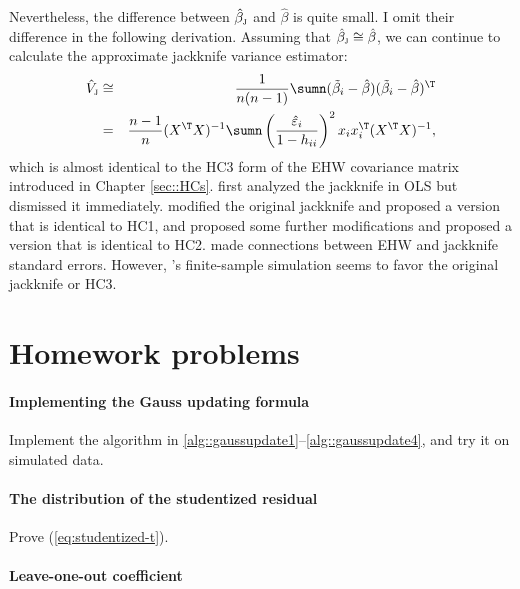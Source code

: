  
 Nevertheless, the difference between $\hat{\beta}_\textsc{j}$ and $\hat{\beta}$  is quite small. I omit their difference in the following derivation. Assuming that $\hat{\beta}_\textsc{j}  \cong \hat{\beta} $, we can continue to calculate the approximate jackknife variance estimator:
\begin{eqnarray*}
\hat{V}_\textsc{j} &\cong& \frac{1}{n(n-1)} \sumn (\tilde{\beta}_i - \hat{\beta})(\tilde{\beta}_i  - \hat{\beta})^{\T} \\
&=& \frac{n-1}{n} (X^{\T}X)^{-1}  \sumn \left(  \frac{  \hat{\varepsilon}_{i}  }{ 1-h_{ii}} \right)^2 x_{i}x_{i}^{\T}  (X^{\T}X)^{-1},
\end{eqnarray*} 
which is almost identical to the HC3 form of the EHW covariance matrix introduced in Chapter \ref{sec::HCs}. \citet{miller1974unbalanced} first analyzed the jackknife in OLS but dismissed it immediately. \citet{hinkley1977jackknifing} modified the original jackknife and proposed a version that is identical to HC1, and \citet{wu1986jackknife} proposed some further modifications and proposed a version that is identical to HC2. 
\citet{weber1986jackknife} made connections between EHW and jackknife standard errors. 
However, \citet{long2000using}'s finite-sample simulation seems to favor the original jackknife or HC3. 




\section{Homework problems}





\paragraph{Implementing the Gauss updating formula}
Implement the algorithm in \eqref{alg::gaussupdate1}--\eqref{alg::gaussupdate4}, and try it on simulated data. 


\paragraph{The distribution of the studentized residual}\label{hw10::studentized-residual}

Prove (\ref{eq:studentized-t}).



\paragraph{Leave-one-out coefficient}\label{hw10::loo-coefficient}

